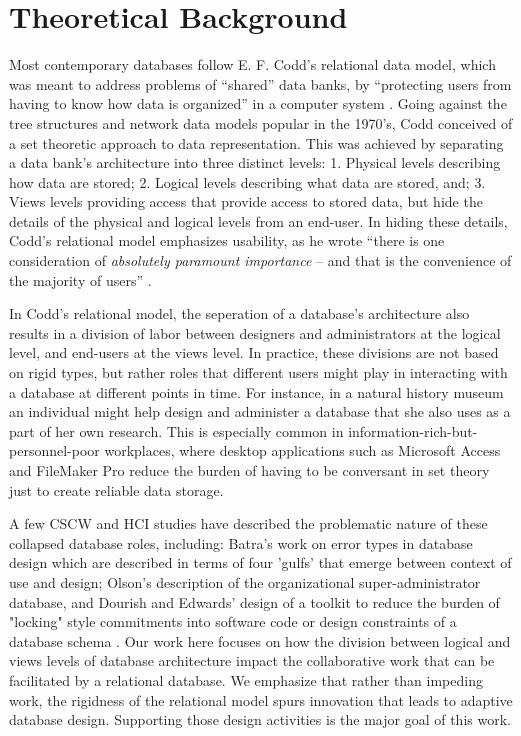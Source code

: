 \section{Theoretical Background}
Most contemporary databases follow E. F. Codd's relational data model, which was meant to address problems of “shared” data banks, by  “protecting users from having to know how data is organized” in a computer system  \cite[p. 377]{Codd_1970}. Going against the tree structures and network data models popular in the 1970's, Codd conceived of a set theoretic approach to data representation. This was achieved by separating a data bank's architecture into three distinct levels: 1. Physical levels describing how data are stored; 2. Logical levels describing what data are stored, and; 3. Views levels providing access that provide access to stored data, but hide the details of the physical and logical levels from an end-user. In hiding these details, Codd's relational model emphasizes usability, as he wrote “there is one consideration of \emph{absolutely paramount importance} – and that is the convenience of the majority of users” \cite[p.2]{Codd_1971}.

In Codd's relational model, the seperation of a database's architecture also results in a division of labor between designers and administrators at the logical level, and end-users at the views level. In practice, these divisions are not based on rigid types, but rather roles that different users might play in interacting with a database at different points in time. For instance, in a natural history museum an individual might help design and administer a database that she also uses as a part of her own research. This is especially common in information-rich-but-personnel-poor workplaces, where desktop applications such as Microsoft Access and FileMaker Pro reduce the burden of having to be conversant in set theory just to create reliable data storage. 

A few CSCW and HCI studies have described the problematic nature of these collapsed database roles, including: Batra's work on error types in database design \cite{Batra_1993} which are described in terms of  four 'gulfs' that emerge between context of use and design; Olson's description of the organizational super-administrator \cite{olson2010} database, and Dourish and Edwards' design of a toolkit to reduce the burden of "locking" style commitments into software code or design constraints of a database schema \cite{Dourish_2000}. Our work here focuses on how the division between logical and views levels of database architecture impact the collaborative work that can be facilitated by a relational database. We emphasize that rather than impeding work, the rigidness of the relational model spurs innovation that leads to adaptive database design. Supporting those design activities is the major goal of this work. 

